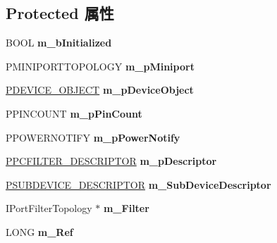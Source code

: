 \subsection*{Protected 属性}
\begin{DoxyCompactItemize}
\item 
\mbox{\label{class_c_port_topology_ae613bdaab201fd583da1653059c55ebc}} 
B\+O\+OL {\bfseries m\+\_\+b\+Initialized}
\item 
\mbox{\label{class_c_port_topology_a3886a1c15b9cbe8497e60c1d3573d7ea}} 
P\+M\+I\+N\+I\+P\+O\+R\+T\+T\+O\+P\+O\+L\+O\+GY {\bfseries m\+\_\+p\+Miniport}
\item 
\mbox{\label{class_c_port_topology_a802b2b561b81324ce39f525adea41470}} 
\hyperlink{struct___d_e_v_i_c_e___o_b_j_e_c_t}{P\+D\+E\+V\+I\+C\+E\+\_\+\+O\+B\+J\+E\+CT} {\bfseries m\+\_\+p\+Device\+Object}
\item 
\mbox{\label{class_c_port_topology_aa366e6254a9976e3ea7abe9aa8fb1725}} 
P\+P\+I\+N\+C\+O\+U\+NT {\bfseries m\+\_\+p\+Pin\+Count}
\item 
\mbox{\label{class_c_port_topology_af21e7c18dfdbce8818aa51b28fbc24c4}} 
P\+P\+O\+W\+E\+R\+N\+O\+T\+I\+FY {\bfseries m\+\_\+p\+Power\+Notify}
\item 
\mbox{\label{class_c_port_topology_aa0b014f1d1d0230664c5113ddace1d5f}} 
\hyperlink{struct_p_c_f_i_l_t_e_r___d_e_s_c_r_i_p_t_o_r}{P\+P\+C\+F\+I\+L\+T\+E\+R\+\_\+\+D\+E\+S\+C\+R\+I\+P\+T\+OR} {\bfseries m\+\_\+p\+Descriptor}
\item 
\mbox{\label{class_c_port_topology_ab9b2e9e425848864cdc3e3688b320236}} 
\hyperlink{struct_s_u_b_d_e_v_i_c_e___d_e_s_c_r_i_p_t_o_r}{P\+S\+U\+B\+D\+E\+V\+I\+C\+E\+\_\+\+D\+E\+S\+C\+R\+I\+P\+T\+OR} {\bfseries m\+\_\+\+Sub\+Device\+Descriptor}
\item 
\mbox{\label{class_c_port_topology_a3e78345959395e8288f0c82147c2a8da}} 
I\+Port\+Filter\+Topology $\ast$ {\bfseries m\+\_\+\+Filter}
\item 
\mbox{\label{class_c_port_topology_a197421a2c77d3fe9d7283e2d517e9e5d}} 
L\+O\+NG {\bfseries m\+\_\+\+Ref}
\end{DoxyCompactItemize}
